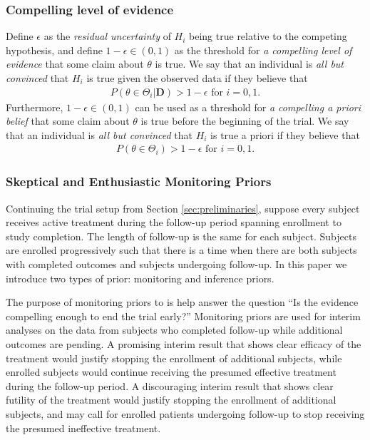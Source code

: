 \documentclass[12pt]{article}
\begin{document}
\subsubsection{Compelling level of evidence}
Define $\epsilon$ as the \textit{residual uncertainty} of $H_i$ being true relative to the competing hypothesis, and define $1-\epsilon\in(0,1)$ as the threshold for \textit{a compelling level of evidence} that some claim about $\theta$ is true. We say that an individual is \textit{all but convinced} that $H_i$ is true given the observed data if they believe that
\begin{align}\label{eq:compellingevidence}
P(\theta\in\Theta_i|\mathbf{D})> 1-\epsilon\text{ for }i=0,1.
\end{align} 
%
Furthermore, $1-\epsilon\in(0,1)$ can be used as a threshold for \textit{a compelling a priori belief} that some claim about $\theta$ is true before the beginning of the trial. We say that an individual is \textit{all but convinced} that $H_i$ is true a priori if they believe that
\begin{align}\label{eq:compellingapriori}
P(\theta\in\Theta_i)>1-\epsilon\text{ for }i=0,1.
\end{align} 

\subsubsection{Skeptical and Enthusiastic Monitoring Priors}\label{sec:MP}
Continuing the trial setup from Section \ref{sec:preliminaries}, suppose every subject receives active treatment during the follow-up period spanning enrollment to study completion. The length of follow-up is the same for each subject. Subjects are enrolled progressively such that there is a time when there are both subjects with completed outcomes and subjects undergoing follow-up. In this paper we introduce two types of prior: monitoring and inference priors. 

The purpose of monitoring priors to is help answer the question ``Is the evidence compelling enough to end the trial early?'' Monitoring priors are used for interim analyses on the data from subjects who completed follow-up while additional outcomes are pending. A promising interim result that shows clear efficacy of the treatment would justify stopping the enrollment of additional subjects, while enrolled subjects would continue receiving the presumed effective treatment during the follow-up period. A discouraging interim result that shows clear futility of the treatment would justify stopping the enrollment of additional subjects, and may call for enrolled patients undergoing follow-up to stop receiving the presumed ineffective treatment. 
\end{document}
